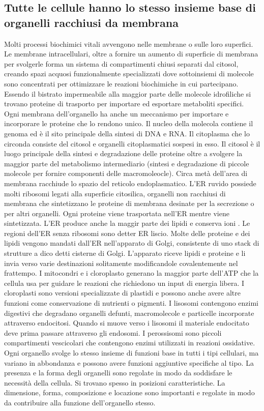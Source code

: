 \subsection{Tutte le cellule hanno lo stesso insieme base di organelli racchiusi da membrana}
Molti processi biochimici vitali avvengono nelle membrane o sulle loro superfici. Le membrane intracellulari, oltre a fornire un aumento di superficie di membrana per svolgerle forma
un sistema di compartimenti chiusi separati dal citosol, creando spazi acquosi funzionalmente specializzati dove sottoinsiemi di molecole sono concentrati per ottimizzare le reazioni
biochimiche in cui partecipano. Essendo il bistrato impermeabile alla maggior parte delle molecole idrofiliche si trovano proteine di trasporto per importare ed esportare metaboliti
specifici. Ogni membrana dell'organello ha anche un meccanismo per importare e incorporare le proteine che lo rendono unico. Il nucleo della molecola contiene il genoma ed \`e il sito
principale della sintesi di DNA e RNA. Il citoplasma che lo circonda consiste del citosol e organelli citoplasmatici sospesi in esso. Il citosol \`e il luogo principale della sintesi
e degradazione delle proteine oltre a svolgere la maggior parte del metabolismo intermediario (sintesi e degradazione di piccole molecole per fornire componenti delle macromoleocle). 
Circa met\`a dell'area di membrana racchiude lo spazio del reticolo endoplasmatico. L'ER ruvido possiede molti ribosomi legati alla superficie citosilica, organelli non racchiusi di 
membrana che sintetizzano le proteine di membrana desinate per la secrezione o per altri organelli. Ogni proteine viene trasportata nell'ER mentre viene sintetizzata. L'ER produce anche
la maggir parte dei lipidi e conserva ioni . Le regioni dell'ER senza ribosomi sono detter ER liscio. Molte delle proteine e dei lipidi vengono mandati dall'ER nell'apparato
di Golgi, consistente di uno stack di strutture a dico detti cisterne di Golgi. L'apparato riceve lipidi e proteine e li invia verso varie destinazioni solitamente modificandole 
covalentemente nel frattempo. I mitocondri e i cloroplasto generano la maggior parte dell'ATP che la cellula usa per guidare le reazioni che richiedono un input di energia libera. I 
cloroplasti sono versioni specializzate di plastidi e possono anche avere altre funzioni come conservazione di nutrienti o pigmenti. I lisosomi contengono enzimi digestivi che degradano
organelli defunti, macromolecole e particelle incorporate attraverso endocitosi. Quando si muove verso i lisosomi il materiale endocitato deve prima passare attraverso gli endosomi. 
I perossisomi sono piccoli compartimenti vescicolari che contengono enzimi utilizzati in reazioni ossidative. Ogni organello svolge lo stesso insieme di funzioni base in tutti i tipi
cellulari, ma variano in abbondanza e possono avere funzioni aggiuntive specifiche al tipo. La presenza e la forma degli organelli sono regolate in modo da soddisfare le necessit\`a 
della cellula. Si trovano spesso in posizioni caratteristiche. La dimensione, forma, composizione e locazione sono importanti e regolate in modo da contribuire alla funzione 
dell'organello stesso.
